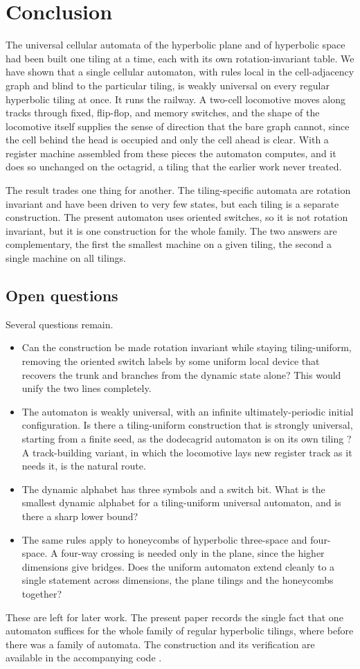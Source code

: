 \section{Conclusion}
\label{sec:conclusion}

The universal cellular automata of the hyperbolic plane and of hyperbolic space had been built one tiling at a
time, each with its own rotation-invariant table. We have shown that a single cellular automaton, with rules
local in the cell-adjacency graph and blind to the particular tiling, is weakly universal on every regular
hyperbolic tiling at once. It runs the railway. A two-cell locomotive moves along tracks through fixed,
flip-flop, and memory switches, and the shape of the locomotive itself supplies the sense of direction that the
bare graph cannot, since the cell behind the head is occupied and only the cell ahead is clear. With a register
machine assembled from these pieces the automaton computes, and it does so unchanged on the octagrid, a tiling
that the earlier work never treated.

The result trades one thing for another. The tiling-specific automata are rotation invariant and have been
driven to very few states, but each tiling is a separate construction. The present automaton uses oriented
switches, so it is not rotation invariant, but it is one construction for the whole family. The two answers are
complementary, the first the smallest machine on a given tiling, the second a single machine on all tilings.

\subsection{Open questions}

Several questions remain.

\begin{itemize}
  \item Can the construction be made rotation invariant while staying tiling-uniform, removing the oriented
  switch labels by some uniform local device that recovers the trunk and branches from the dynamic state alone?
  This would unify the two lines completely.
  \item The automaton is weakly universal, with an infinite ultimately-periodic initial configuration. Is there
  a tiling-uniform construction that is strongly universal, starting from a finite seed, as the dodecagrid
  automaton is on its own tiling \cite{margenstern2021dodeca5}? A track-building variant, in which the
  locomotive lays new register track as it needs it, is the natural route.
  \item The dynamic alphabet has three symbols and a switch bit. What is the smallest dynamic alphabet for a
  tiling-uniform universal automaton, and is there a sharp lower bound?
  \item The same rules apply to honeycombs of hyperbolic three-space and four-space. A four-way crossing is
  needed only in the plane, since the higher dimensions give bridges. Does the uniform automaton extend cleanly
  to a single statement across dimensions, the plane tilings and the honeycombs together?
\end{itemize}

These are left for later work. The present paper records the single fact that one automaton suffices for the
whole family of regular hyperbolic tilings, where before there was a family of automata. The construction and
its verification are available in the accompanying code \cite{pollard2026vibe}.
